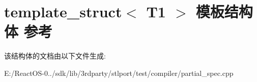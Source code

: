 \hypertarget{structtemplate__struct}{}\section{template\+\_\+struct$<$ T1 $>$ 模板结构体 参考}
\label{structtemplate__struct}


该结构体的文档由以下文件生成\+:\begin{DoxyCompactItemize}
\item 
E\+:/\+React\+O\+S-\/0../sdk/lib/3rdparty/stlport/test/compiler/partial\+\_\+spec.\+cpp\end{DoxyCompactItemize}
